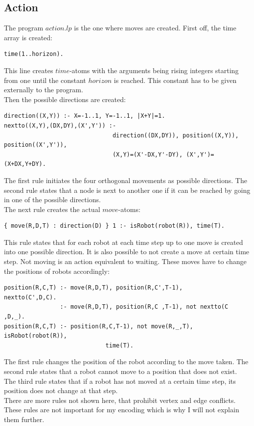 \documentclass[runningheads]{llncs}
\begin{document}
\subsection{Action}
The program $action.lp$ is the one where moves are created. First off, the time array is created:
\begin{verbatim}
time(1..horizon).
\end{verbatim}
This line creates $time$-atoms with the arguments being rising integers starting from one until the constant $horizon$ is reached. This constant has to be given externally to the program.  \\
Then the possible directions are created:
\begin{verbatim}
direction((X,Y)) :- X=-1..1, Y=-1..1, |X+Y|=1.
nextto((X,Y),(DX,DY),(X',Y')) :- 
                               direction((DX,DY)), position((X,Y)), position((X',Y')),
                               (X,Y)=(X'-DX,Y'-DY), (X',Y')=(X+DX,Y+DY).
\end{verbatim}
The first rule initiates the four orthogonal movements as possible directions. The second rule states that a node is next to another one if it can be reached by going in one of the possible directions. \\
The next rule creates the actual $move$-atoms:
\begin{verbatim}
{ move(R,D,T) : direction(D) } 1 :- isRobot(robot(R)), time(T).
\end{verbatim}
This rule states that for each robot at each time step up to one move is created into one possible direction. It is also possible to not create a move at certain time step. Not moving is an action equivalent to waiting. These moves have to change the positions of robots accordingly:
\begin{verbatim}
position(R,C,T) :- move(R,D,T), position(R,C',T-1),     nextto(C',D,C).
                :- move(R,D,T), position(R,C ,T-1), not nextto(C ,D,_).
position(R,C,T) :- position(R,C,T-1), not move(R,_,T), isRobot(robot(R)), 
                             time(T).
\end{verbatim}
The first rule changes the position of the robot according to the move taken. The second rule states that a robot cannot move to a position that does not exist. The third rule states that if a robot has not moved at a certain time step, its position does not change at that step. \\
There are more rules not shown here, that prohibit vertex and edge conflicts. These rules are not important for my encoding which is why I will not explain them further. 
\end{document}
